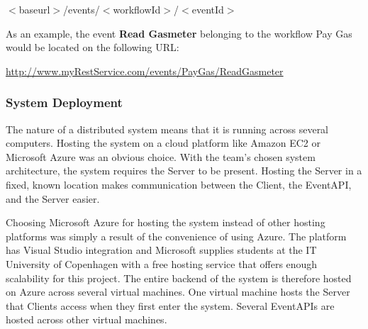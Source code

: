 \begin{center}
$<$baseurl$>$/events/$<$workflowId$>$/$<$eventId$>$
\end{center}

As an example, the event \textbf{Read Gasmeter} belonging to the workflow Pay Gas would be located on the following URL:  

\begin{center}
\url{http://www.myRestService.com/events/PayGas/ReadGasmeter}
\end{center}


\subsubsection{System Deployment \label{sec:SystemDeployment}}
The nature of a distributed system means that it is running across several computers. Hosting the system on a cloud platform like Amazon EC2 or Microsoft Azure was an obvious choice. With the team’s chosen system architecture, the system requires the Server to be present. Hosting the Server in a fixed, known location makes communication between the Client, the EventAPI, and the Server easier. 

Choosing Microsoft Azure for hosting the system instead of other hosting platforms was simply a result of the convenience of using Azure. The platform has Visual Studio integration and Microsoft supplies students at the IT University of Copenhagen with a free hosting service that offers enough scalability for this project. The entire backend of the system is therefore hosted on Azure across several virtual machines. One virtual machine hosts the Server that Clients access when they first enter the system. Several EventAPIs are hosted across other virtual machines. 

